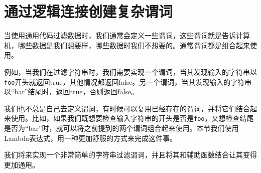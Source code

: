 \section{通过逻辑连接创建复杂谓词}

当使用通用代码过滤数据时，我们通常会定义一些谓词，这些谓词就是告诉计算机，哪些数据是我们想要样，哪些数据时我们不想要的。通常谓词都是组合起来使用。

例如，当我们在过滤字符串时，我们需要实现一个谓词，当其发现输入的字符串以\texttt{foo}开头就返回true，其他情况都返回false。另一个谓词，当其发现输入的字符串以“bar”结尾时，返回true，否则返回false。

我们也不总是自己去定义谓词，有时候可以复用已经存在的谓词，并将它们结合起来使用。比如，如果我们既想要检查输入字符串的开头是否是\texttt{foo}，又想检查结尾是否为“bar”时，就可以将之前提到的两个谓词组合起来使用。本节我们使用Lambda表达式，用一种更加舒服的方式来完成这件事。


我们将来实现一个非常简单的字符串过滤谓词，并且将其和辅助函数结合让其变得更加通用。

